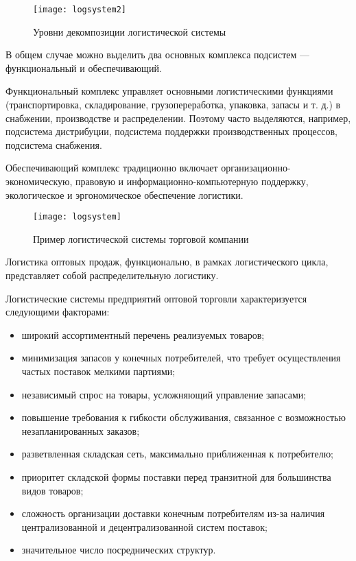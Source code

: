\begin{figure}[h]
	\centering
	\texttt{[image: logsystem2]}
	\caption{Уровни декомпозиции логистической системы}
	\label{fig:logsystem2}
\end{figure}

В общем случае можно выделить два основных комплекса подсистем --- функциональный и обеспечивающий.

Функциональный комплекс управляет основными логистическими функциями (транспортировка, складирование, грузопереработка, упаковка, запасы и т. д.) в снабжении, производстве и распределении.
Поэтому часто выделяются, например, подсистема дистрибуции, подсистема поддержки производственных процессов, подсистема снабжения.

Обеспечивающий комплекс традиционно включает организационно-экономическую, правовую и информационно-компьютерную поддержку, экологическое и эргономическое обеспечение логистики.

\begin{figure}[h]
	\centering
	\texttt{[image: logsystem]}
	\caption{Пример логистической системы торговой компании}
	\label{fig:logsystem}
\end{figure}


Логистика оптовых продаж, функционально, в рамках логистического цикла, представляет собой распределительную логистику.

Логистические системы предприятий оптовой торговли характеризуется следующими факторами:
\begin{itemize}
	\item широкий ассортиментный перечень реализуемых товаров;
	\item минимизация запасов у конечных потребителей, что требует осуществления частых поставок мелкими партиями;
	\item независимый спрос на товары, усложняющий управление запасами;
	\item повышение требования к гибкости обслуживания, связанное с возможностью незапланированных заказов;
	\item разветвленная складская сеть, максимально приближенная к потребителю;
	\item приоритет складской формы поставки перед транзитной для большинства видов товаров;
	\item сложность организации доставки конечным потребителям из-за наличия централизованной и децентрализованной систем поставок;
	\item значительное число посреднических структур.
\end{itemize}

